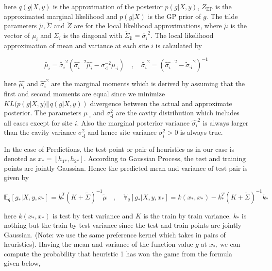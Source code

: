 \documentclass{scrartcl}
\begin{document}
{here $q(g|X,y)$ is the approximation of the posterior $p(g|X,y)$, $Z_\text{EP}$ is the approximated marginal likelihood and $p(g|X)$ is the GP prior of $g$. The tilde parameters $\widetilde{\mu} , \widetilde{\Sigma}$ and $\widetilde{Z}$ are for the local likelihood approximations, where $\widetilde{\mu}$ is the vector of $\mu_i$ and $\Sigma_i$ is the diagonal with $ \widetilde{\Sigma}_\text{ii} = \widetilde{\sigma_i}^{2}$. The local likelihood approximation of mean and variance at each site $i$ is calculated by



\begin{equation}
\widetilde{\mu_i} = \widetilde{\sigma_i}^{2}(\widehat{\sigma_i}^{-2}\widehat{\mu_i} - \sigma_\text{-i}^{-2}\mu_\text{-i})
 \quad , \quad 
\widetilde{\sigma_i}^{2} = ( \widehat{\sigma_i}^{-2} - \widetilde{\sigma}_\text{-i}^{-2} )^{-1}
\end{equation}


here $\widehat{\mu_i}$ and $\widehat{\sigma_i}^{2}$ are the marginal moments which is derived by assuming that the first and second moments are equal since we minimize $KL(p(g|X,y)||q(g|X,y))$ divergence between the actual and approximate posterior. The parameters $\mu_\text{-i}$ and $\sigma_\text{-i}^{2}$ are the cavity distribution which includes all cases except for site $i$. Also the marginal posterior variance $ \widehat{\sigma_i}^{2}$ is always larger than the cavity variance $ \sigma_\text{-i}^{2}$ and hence site variance $\sigma_i^{2} > 0$ \cite{rasmussen2006gaussian} is always true.


\hfill 

In the case of Predictions, the test point or pair of heuristics as in our case is denoted as $x_* = [h_\text{1*},h_\text{2*}]$. According to Gaussian Process, the test and training points are jointly Gaussian. Hence the predicted mean and variance of test pair is given by

\begin{equation}
\mathbb{E}_q[g_*|X,y,x_*] = k_*^{T}(K + \widetilde{\Sigma})^{-1}\widetilde{\mu}
 \quad, \quad
\mathbb{V}_q[g_*|X,y,x_*] = k(x_*,x_*) -  k_*^{T}(K + \widetilde{\Sigma})^{-1} k_*
\end{equation}

here $k(x_*,x_*)$ is test by test variance and $K$ is the train by train variance. $k_*$ is nothing but the train by test variance since the test and train points are jointly Gaussian. (Note: we use the same preference kernel which takes in pairs of heuristics). Having the mean and variance of the function value $g$ at $x_*$, we can compute the probability that heuristic 1 has won the game from the formula given below,



}
\end{document}
